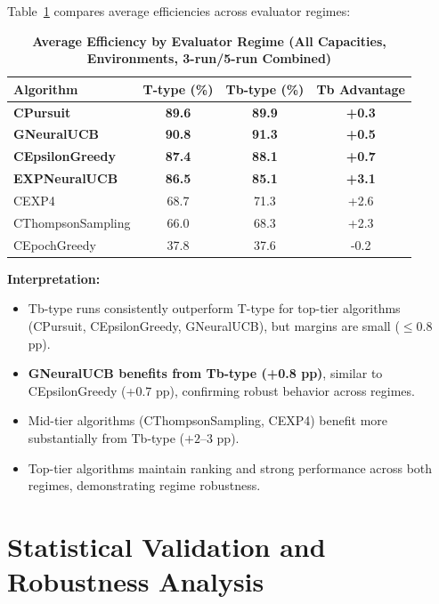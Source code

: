 \documentclass[12pt,a4paper]{article}
\newcommand{\performance}[1]{\textcolor{performancecolor}{\textbf{#1}}}
\newcommand{\legacy}[1]{\textcolor{legacycolor}{\textbf{#1}}}
\newcommand{\neural}[1]{\textcolor{neuralcolor}{\textbf{#1}}}
\begin{document}
Table~\ref{tab:regime-comparison} compares average efficiencies across evaluator regimes:

\begin{table}[H]
\centering
\caption{\performance{Average Efficiency by Evaluator Regime (All Capacities, Environments, 3-run/5-run Combined)}}
\label{tab:regime-comparison}
\begin{tabular}{|l|c|c|c|}
\hline
\textbf{Algorithm} & \textbf{T-type (\%)} & \textbf{Tb-type (\%)} & \textbf{Tb Advantage} \\
\hline
\hline
\performance{CPursuit}        & \performance{89.6} & \performance{89.9} & \performance{+0.3} \\
\neural{GNeuralUCB}          & \neural{90.8} & \neural{91.3} & \neural{+0.5} \\
\performance{CEpsilonGreedy} & \performance{87.4} & \performance{88.1} & \performance{+0.7} \\
\legacy{EXPNeuralUCB}        & \legacy{86.5}     & \legacy{85.1}     & \legacy{+3.1} \\
CEXP4                        & 68.7              & 71.3              & +2.6 \\
CThompsonSampling            & 66.0              & 68.3              & +2.3 \\
CEpochGreedy                 & 37.8              & 37.6              & -0.2 \\
\hline
\end{tabular}
\end{table}

\textbf{Interpretation:}
\begin{itemize}
\item Tb-type runs consistently outperform T-type for top-tier algorithms (CPursuit, CEpsilonGreedy, GNeuralUCB), but margins are small ($\leq$0.8 pp).
\item \neural{GNeuralUCB benefits from Tb-type (+0.8 pp)}, similar to CEpsilonGreedy (+0.7 pp), confirming robust behavior across regimes.
\item Mid-tier algorithms (CThompsonSampling, CEXP4) benefit more substantially from Tb-type ($+2$--3 pp).
\item Top-tier algorithms maintain ranking and strong performance across both regimes, demonstrating regime robustness.
\end{itemize}

\section{Statistical Validation and Robustness Analysis}
\end{document}
